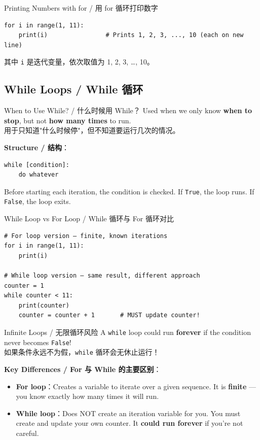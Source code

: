 \documentclass[11pt,a4paper]{report}
\let\oldtexttt\texttt
\renewcommand{\texttt}[1]{\textcolor{mainblue}{\oldtexttt{#1}}}
\begin{document}
\begin{examplebox}{Printing Numbers with for / 用 for 循环打印数字}
\begin{lstlisting}
for i in range(1, 11):
    print(i)                # Prints 1, 2, 3, ..., 10 (each on new line)
\end{lstlisting}
    其中 \texttt{i} 是迭代变量，依次取值为 1, 2, 3, …, 10。
\end{examplebox}

\subsection{While Loops / While 循环}

\begin{concept}{When to Use While? / 什么时候用 While？}
    Used when we only know \textbf{when to stop}, but not \textbf{how many times} to run. \\
    用于只知道"什么时候停"，但不知道要运行几次的情况。

    \textbf{Structure / 结构}：
    \begin{lstlisting}
while [condition]:
    do whatever
    \end{lstlisting}
    Before starting each iteration, the condition is checked. If \texttt{True}, the loop runs. If \texttt{False}, the loop exits.
\end{concept}

\begin{examplebox}{While Loop vs For Loop / While 循环与 For 循环对比}
\begin{lstlisting}
# For loop version — finite, known iterations
for i in range(1, 11):
    print(i)

# While loop version — same result, different approach
counter = 1
while counter < 11:
    print(counter)
    counter = counter + 1       # MUST update counter!
\end{lstlisting}
\end{examplebox}

\begin{warning}{Infinite Loops / 无限循环风险}
    A \texttt{while} loop could run \textbf{forever} if the condition never becomes \texttt{False}! \\
    如果条件永远不为假，\texttt{while} 循环会无休止运行！

    \textbf{Key Differences / For 与 While 的主要区别}：
    \begin{itemize}[itemsep=0.3em]
        \item \textbf{For loop}：Creates a variable to iterate over a given sequence. It is \textbf{finite} — you know exactly how many times it will run.
        \item \textbf{While loop}：Does NOT create an iteration variable for you. You must create and update your own counter. It \textbf{could run forever} if you're not careful.
    \end{itemize}
\end{warning}
\end{document}
